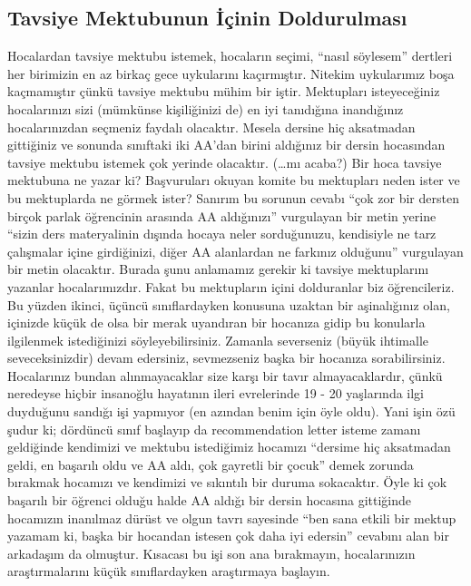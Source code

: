 \documentclass[12pt]{article}
\begin{document}
\subsection{Tavsiye Mektubunun İçinin Doldurulması}
Hocalardan tavsiye mektubu istemek, hocaların seçimi, “nasıl söylesem” dertleri her birimizin en az birkaç gece uykularını kaçırmıştır. Nitekim uykularımız boşa kaçmamıştır çünkü tavsiye mektubu mühim bir iştir. Mektupları isteyeceğiniz hocalarınızı sizi (mümkünse kişiliğinizi de) en iyi tanıdığına inandığınız hocalarınızdan seçmeniz faydalı olacaktır. Mesela dersine hiç aksatmadan gittiğiniz ve sonunda sınıftaki iki AA’dan birini aldığınız bir dersin hocasından tavsiye mektubu istemek çok yerinde olacaktır. (…mı acaba?) Bir hoca tavsiye mektubuna ne yazar ki? Başvuruları okuyan komite bu mektupları neden ister ve bu mektuplarda ne görmek ister? Sanırım bu sorunun cevabı “çok zor bir dersten birçok parlak öğrencinin arasında AA aldığınızı” vurgulayan bir metin yerine “sizin ders materyalinin dışında hocaya neler sorduğunuzu, kendisiyle ne tarz çalışmalar içine girdiğinizi, diğer AA alanlardan ne farkınız olduğunu” vurgulayan bir metin olacaktır. Burada şunu anlamamız gerekir ki tavsiye mektuplarını yazanlar hocalarımızdır. Fakat bu mektupların içini dolduranlar biz öğrencileriz. Bu yüzden ikinci, üçüncü sınıflardayken konusuna uzaktan bir aşinalığınız olan, içinizde küçük de olsa bir merak uyandıran bir hocanıza gidip bu konularla ilgilenmek istediğinizi söyleyebilirsiniz. Zamanla severseniz (büyük ihtimalle seveceksinizdir) devam edersiniz, sevmezseniz başka bir hocanıza sorabilirsiniz. Hocalarınız bundan alınmayacaklar size karşı bir tavır almayacaklardır, çünkü neredeyse hiçbir insanoğlu hayatının ileri evrelerinde 19 - 20 yaşlarında ilgi duyduğunu sandığı işi yapmıyor (en azından benim için öyle oldu). Yani işin özü şudur ki; dördüncü sınıf başlayıp da recommendation letter isteme zamanı geldiğinde kendimizi ve mektubu istediğimiz hocamızı “dersime hiç aksatmadan geldi, en başarılı oldu ve AA aldı, çok gayretli bir çocuk” demek zorunda bırakmak hocamızı ve kendimizi ve sıkıntılı bir duruma sokacaktır. Öyle ki çok başarılı bir öğrenci olduğu halde AA aldığı bir dersin hocasına gittiğinde hocamızın inanılmaz dürüst ve olgun tavrı sayesinde “ben sana etkili bir mektup yazamam ki, başka bir hocandan istesen çok daha iyi edersin” cevabını alan bir arkadaşım da olmuştur. Kısacası bu işi son ana bırakmayın, hocalarınızın araştırmalarını küçük sınıflardayken araştırmaya başlayın.
\end{document}
